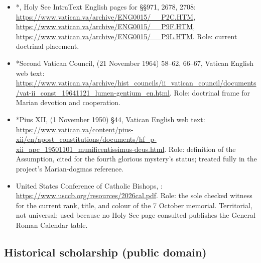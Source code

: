 \begin{itemize}
addition by competent authority. With Benedict XV's letter of 5 May 1917
( 9/I, 266) and the Congregation of Rites' decree
 of 31 October 1950 ( 42, 795), both in
the Holy See's  archive.
\item *, Holy See IntraText
English pages for \S\S 971, 2678, 2708:
\url{https://www.vatican.va/archive/ENG0015/__P2C.HTM},
\url{https://www.vatican.va/archive/ENG0015/__P9F.HTM},
\url{https://www.vatican.va/archive/ENG0015/__P9L.HTM}. Role: current
doctrinal placement.
\item *Second Vatican Council,  (21 November
1964) 58--62, 66--67, Vatican English web text:
\url{https://www.vatican.va/archive/hist_councils/ii_vatican_council/documents/vat-ii_const_19641121_lumen-gentium_en.html}.
Role: doctrinal frame for Marian devotion and cooperation.
\item *Pius XII,  (1 November 1950)
\S 44, Vatican English web text:
\url{https://www.vatican.va/content/pius-xii/en/apost_constitutions/documents/hf_p-xii_apc_19501101_munificentissimus-deus.html}.
Role: definition of the Assumption, cited for the fourth glorious
mystery's status; treated fully in the project's Marian-dogmas
reference.
\item United States Conference of Catholic Bishops, :
\url{https://www.usccb.org/resources/2026cal.pdf}. Role: the sole
checked witness for the current rank, title, and colour of the 7 October
memorial. Territorial, not universal; used because no Holy See page
consulted publishes the General Roman Calendar table.
\end{itemize}

\subsection*{Historical scholarship (public domain)}

